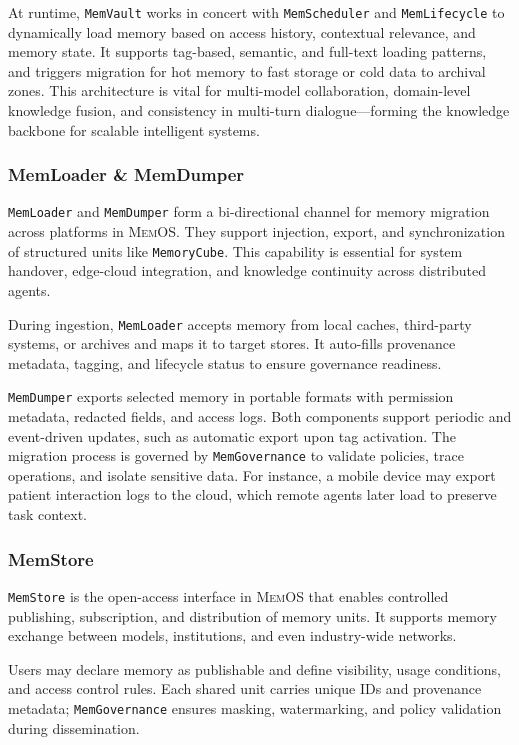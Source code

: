 \documentclass[]{memtensor}
\begin{document}
At runtime, \texttt{MemVault} works in concert with \texttt{MemScheduler} and \texttt{MemLifecycle} to dynamically load memory based on access history, contextual relevance, and memory state.
It supports tag-based, semantic, and full-text loading patterns, and triggers migration for hot memory to fast storage or cold data to archival zones.
This architecture is vital for multi-model collaboration, domain-level knowledge fusion, and consistency in multi-turn dialogue—forming the knowledge backbone for scalable intelligent systems.

\subsubsection{MemLoader \& MemDumper}
\texttt{MemLoader} and \texttt{MemDumper} form a bi-directional channel for memory migration across platforms in \textsc{MemOS}.
They support injection, export, and synchronization of structured units like \texttt{MemoryCube}.
This capability is essential for system handover, edge-cloud integration, and knowledge continuity across distributed agents.

During ingestion, \texttt{MemLoader} accepts memory from local caches, third-party systems, or archives and maps it to target stores.
It auto-fills provenance metadata, tagging, and lifecycle status to ensure governance readiness.

\texttt{MemDumper} exports selected memory in portable formats with permission metadata, redacted fields, and access logs.
Both components support periodic and event-driven updates, such as automatic export upon tag activation.
The migration process is governed by \texttt{MemGovernance} to validate policies, trace operations, and isolate sensitive data.
For instance, a mobile device may export patient interaction logs to the cloud, which remote agents later load to preserve task context.

\subsubsection{MemStore}
\texttt{MemStore} is the open-access interface in \textsc{MemOS} that enables controlled publishing, subscription, and distribution of memory units.
It supports memory exchange between models, institutions, and even industry-wide networks.

Users may declare memory as publishable and define visibility, usage conditions, and access control rules.
Each shared unit carries unique IDs and provenance metadata; \texttt{MemGovernance} ensures masking, watermarking, and policy validation during dissemination.
\end{document}
